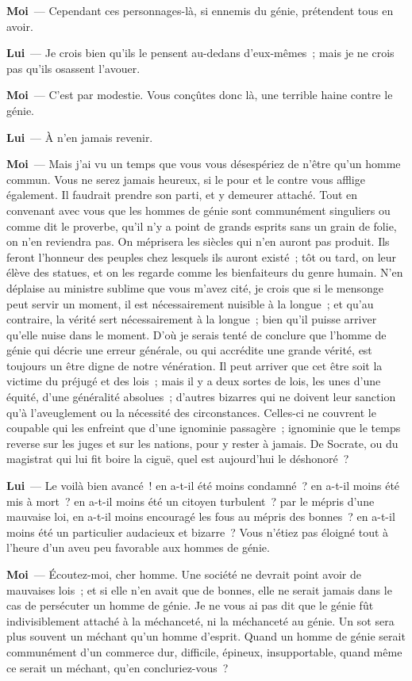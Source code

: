 \documentclass[french,twoside]{book} %
\newcommand{\labelchar}[1]{\textbf{\color{rubric} #1}}
\begin{document}
\labelchar{Moi} — Cependant ces personnages-là, si ennemis du génie, prétendent tous en avoir.\par
\labelchar{Lui} — Je crois bien qu’ils le pensent au-dedans d’eux-mêmes ; mais je ne crois pas qu’ils osassent l’avouer.\par
\labelchar{Moi} — C’est par modestie. Vous conçûtes donc là, une terrible haine contre le génie.\par
\labelchar{Lui} — À n’en jamais revenir.\par
\labelchar{Moi} — Mais j’ai vu un temps que vous vous désespériez de n’être qu’un homme commun. Vous ne serez jamais heureux, si le pour et le contre vous afflige également. Il faudrait prendre son parti, et y demeurer attaché. Tout en convenant avec vous que les hommes de génie sont communément singuliers ou comme dit le proverbe, qu’il n’y a point de grands esprits sans un grain de folie, on n’en reviendra pas. On méprisera les siècles qui n’en auront pas produit. Ils feront l’honneur des peuples chez lesquels ils auront existé ; tôt ou tard, on leur élève des statues, et on les regarde comme les bienfaiteurs du genre humain. N’en déplaise au ministre sublime que vous m’avez cité, je crois que si le mensonge peut servir un moment, il est nécessairement nuisible à la longue ; et qu’au contraire, la vérité sert nécessairement à la longue ; bien qu’il puisse arriver qu’elle nuise dans le moment. D’où je serais tenté de conclure que l’homme de génie qui décrie une erreur générale, ou qui accrédite une grande vérité, est toujours un être digne de notre vénération. Il peut arriver que cet être soit la victime du préjugé et des lois ; mais il y a deux sortes de lois, les unes d’une équité, d’une généralité absolues ; d’autres bizarres qui ne doivent leur sanction qu’à l’aveuglement ou la nécessité des circonstances. Celles-ci ne couvrent le coupable qui les enfreint que d’une ignominie passagère ; ignominie que le temps reverse sur les juges et sur les nations, pour y rester à jamais. De Socrate, ou du magistrat qui lui fit boire la ciguë, quel est aujourd’hui le déshonoré ?\par
\labelchar{Lui} — Le voilà bien avancé ! en a-t-il été moins condamné ? en a-t-il moins été mis à mort ? en a-t-il moins été un citoyen turbulent ? par le mépris d’une mauvaise loi, en a-t-il moins encouragé les fous au mépris des bonnes ? en a-t-il moins été un particulier audacieux et bizarre ? Vous n’étiez pas éloigné tout à l’heure d’un aveu peu favorable aux hommes de génie.\par
\labelchar{Moi} — Écoutez-moi, cher homme. Une société ne devrait point avoir de mauvaises lois ; et si elle n’en avait que de bonnes, elle ne serait jamais dans le cas de persécuter un homme de génie. Je ne vous ai pas dit que le génie fût indivisiblement attaché à la méchanceté, ni la méchanceté au génie. Un sot sera plus souvent un méchant qu’un homme d’esprit. Quand un homme de génie serait communément d’un commerce dur, difficile, épineux, insupportable, quand même ce serait un méchant, qu’en concluriez-vous ?\par
\end{document}
